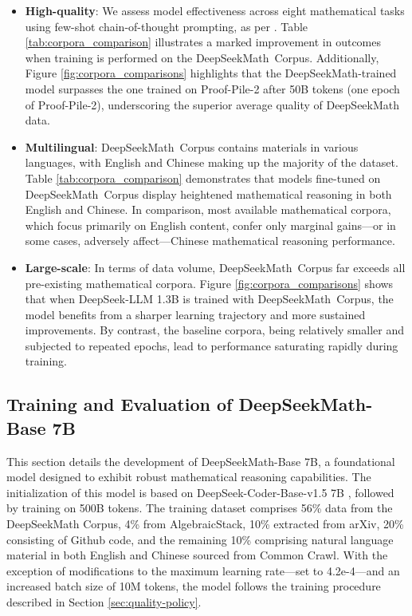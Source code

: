 \begin{itemize}[topsep=0pt]
    \item \textbf{High-quality}: 
    We assess model effectiveness across eight mathematical tasks using few-shot chain-of-thought prompting, as per \cite{cot}. Table \ref{tab:corpora_comparison} illustrates a marked improvement in outcomes when training is performed on the DeepSeekMath~Corpus. Additionally, Figure \ref{fig:corpora_comparisons} highlights that the DeepSeekMath-trained model surpasses the one trained on Proof-Pile-2 after 50B tokens (one epoch of Proof-Pile-2), underscoring the superior average quality of DeepSeekMath data.
    \item \textbf{Multilingual}: 
    DeepSeekMath~Corpus contains materials in various languages, with English and Chinese making up the majority of the dataset. Table \ref{tab:corpora_comparison} demonstrates that models fine-tuned on DeepSeekMath~Corpus display heightened mathematical reasoning in both English and Chinese. In comparison, most available mathematical corpora, which focus primarily on English content, confer only marginal gains—or in some cases, adversely affect—Chinese mathematical reasoning performance.
    \item \textbf{Large-scale}: 
    In terms of data volume, DeepSeekMath~Corpus far exceeds all pre-existing mathematical corpora. Figure \ref{fig:corpora_comparisons} shows that when DeepSeek-LLM 1.3B is trained with DeepSeekMath~Corpus, the model benefits from a sharper learning trajectory and more sustained improvements. By contrast, the baseline corpora, being relatively smaller and subjected to repeated epochs, lead to performance saturating rapidly during training.
\end{itemize}

\subsection{Training and Evaluation of DeepSeekMath-Base 7B}

This section details the development of DeepSeekMath-Base 7B, a foundational model designed to exhibit robust mathematical reasoning capabilities. The initialization of this model is based on DeepSeek-Coder-Base-v1.5 7B \citep{deepseek-coder}, followed by training on 500B tokens. The training dataset comprises 56\% data from the DeepSeekMath Corpus, 4\% from AlgebraicStack, 10\% extracted from arXiv, 20\% consisting of Github code, and the remaining 10\% comprising natural language material in both English and Chinese sourced from Common Crawl. With the exception of modifications to the maximum learning rate—set to 4.2e-4—and an increased batch size of 10M tokens, the model follows the training procedure described in Section \ref{sec:quality-policy}.

